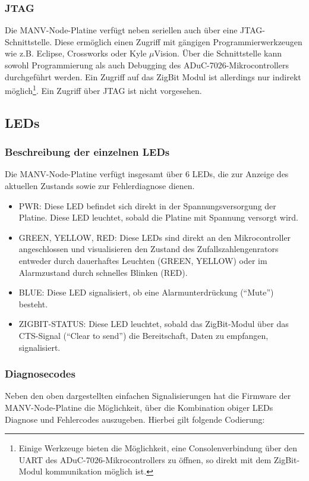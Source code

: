 \subsubsection{JTAG}
Die MANV-Node-Platine verfügt neben seriellen auch über eine JTAG-Schnittstelle. Diese ermöglich einen Zugriff mit
gängigen Programmierwerkzeugen wie z.B. Eclipse, Crossworks oder Kyle $\mu{}$Vision. Über die Schnittstelle kann sowohl 
Programmierung als auch Debugging des ADuC-7026-Mikrocontrollers durchgeführt werden. Ein Zugriff auf das ZigBit
Modul ist allerdings nur indirekt möglich\footnote{Einige Werkzeuge bieten die Möglichkeit, eine Consolenverbindung
über den UART des ADuC-7026-Mikrocontrollers zu öffnen, so direkt mit dem ZigBit-Modul kommunikation möglich ist.}.
Ein Zugriff über JTAG ist nicht vorgesehen.

\subsection{LEDs}

\subsubsection{Beschreibung der einzelnen LEDs}
Die MANV-Node-Platine verfügt insgesamt über 6 LEDs, die zur Anzeige des aktuellen Zustands sowie zur Fehlerdiagnose dienen.
\begin{itemize}
    \item{PWR:} Diese LED befindet sich direkt in der Spannungsversorgung der Platine. Diese LED leuchtet, sobald
                die Platine mit Spannung versorgt wird. 
    \item{GREEN, YELLOW, RED}: Diese LEDs sind direkt an den Mikrocontroller angeschlossen und visualisieren den Zustand des
                               Zufallszahlengenrators entweder durch dauerhaftes Leuchten (GREEN, YELLOW) oder im Alarmzustand
                               durch schnelles Blinken (RED). 
    \item{BLUE}: Diese LED signalisiert, ob eine Alarmunterdrückung ("`Mute"') besteht.
    \item{ZIGBIT-STATUS}: Diese LED leuchtet, sobald das ZigBit-Modul über das CTS-Signal ("`Clear to send"') die Bereitschaft, 
                          Daten zu empfangen, signalisiert.
\end{itemize}
                 
    

\subsubsection{Diagnosecodes}
Neben den oben dargestellten einfachen Signalisierungen hat die Firmware der MANV-Node-Platine die Möglichkeit, über die
Kombination obiger LEDs Diagnose und Fehlercodes auszugeben. Hierbei gilt folgende Codierung:

